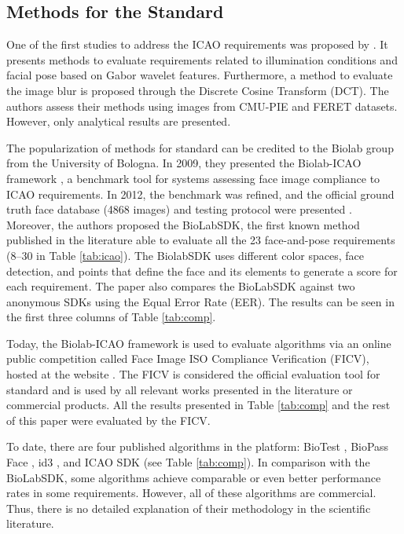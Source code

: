 \subsection{Methods for the \icao Standard}

One of the first studies to address the ICAO requirements was proposed by \citet{sang2009face}. It presents methods to evaluate requirements related to illumination conditions and facial pose based on Gabor wavelet features. Furthermore, a method to evaluate the image blur is proposed through the Discrete Cosine Transform (DCT). The authors assess their methods using images from CMU-PIE and FERET datasets. However, only analytical results are presented.

The popularization of methods for \icao standard can be credited to the Biolab group from the University of Bologna. In 2009, they presented the Biolab-ICAO framework \citep{maltoni2009biolab}, a benchmark tool for systems assessing face image compliance to ICAO requirements. In 2012, the benchmark was refined, and the official ground truth face database (4868 images) and testing protocol were presented \citep{ferrara2012face}. Moreover, the authors proposed the BioLabSDK, the first known method published in the literature able to evaluate all the 23 face-and-pose requirements (8--30 in Table \ref{tab:icao}). The BiolabSDK uses different color spaces, face detection, and points that define the face and its elements to generate a score for each requirement. The paper also compares the BioLabSDK against two anonymous SDKs using the Equal Error Rate (EER). The results can be seen in the first three columns of Table \ref{tab:comp}.



Today, the Biolab-ICAO framework is used to evaluate algorithms via an online public competition called Face Image ISO Compliance Verification (FICV), hosted at the \fvcongoing website \citep{fvcongoing}. The FICV is considered the official evaluation tool for \icao standard and is used by all relevant works presented in the literature or commercial products. All the results presented in Table \ref{tab:comp} and the rest of this paper were evaluated by the FICV.

To date, there are four published algorithms in the \fvcongoing platform: BioTest \citep{fvcBioTest}, BioPass Face \citep{fvcVsoft}, id3 \citep{fvcICAOCompliance}, and ICAO SDK \citep{fvcSeamfix} (see Table \ref{tab:comp}). In comparison with the BioLabSDK, some algorithms achieve comparable or even better performance rates in some requirements. However, all of these algorithms are commercial. Thus, there is no detailed explanation of their methodology in the scientific literature.


